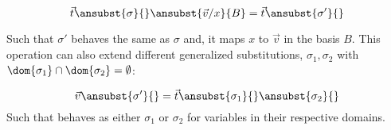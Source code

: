\[
  \vec{t}\ansubst{\sigma}{}\ansubst{\vec{v}/x}{B} = \vec{t}\ansubst{\sigma'}{}
\]

Such that $\sigma'$ behaves the same as $\sigma$ and, it maps $x$ to $\vec{v}$ in the basis $B$. This operation can also extend different generalized substitutions, $\sigma_1, \sigma_2$ with $\dom{\sigma_1}\cap\dom{\sigma_2}=\emptyset$:

\[
\vec{v}\ansubst{\sigma'}{} = \vec{t}\ansubst{\sigma_1}{}\ansubst{\sigma_2}{}
\]
Such that behaves as either $\sigma_1$ or $\sigma_2$ for variables in their respective domains.

\iffalse
A question that might arise from the previous remark could be if taking an $\eta$-expansion on a different basis would yield different a result. In this particular instance, it is fairly simple to see that it is not the case.

\begin{lemma}[$\eta$-expansion]
  For every $\lambda$-abstraction $(\Lam{x}{\basis{X}}{\vec t})$ where $y\not\in\FV{\vec{t}}$, value distribution $\vec{v}\in\sem{\sharp{\basis{X}}}$ a .nd 
  
  \[
    (\Lam{y}{\basis{Y}}{(\Lam{x}{\basis{X}}{\vec t})\ y})\ \vec{v}\evalone (\Lam{x}{\basis{X}}{\vec{t}})\ \vec v
  \]
\end{lemma}

\begin{proof}
  Let $\vec{v}\equiv\sum_{i=1}^{n} \alpha_i \vec{b_i}$ where $\vec{b_i}\in\sem{\basis{Y}}$, we have that:
  \begin{align*}
    (\Lam{y}{\basis{Y}}{(\Lam{x}{\basis{X}}{\vec{t}})}\ y)\ \vec{v}&\evalone(\Lam{x}{\basis{X}}{\vec{t}})\ansubst{\vec{v}/y}{\basis{Y}}\\ 
    &= \sum_{i=1}^{n} \alpha_i (\Lam{x}{\basis{X}}{\vec{t}}) \vec{b_i}\\ 
    &\equiv (\Lam{x}{\basis{X}}{\vec{t}})(\sum_{i=1}^{n}\alpha_i \vec{b_i})\\
    &\equiv (\Lam{x}{\basis{X}}{\vec{t}})\vec{v}
  \end{align*}
\end{proof}
\fi